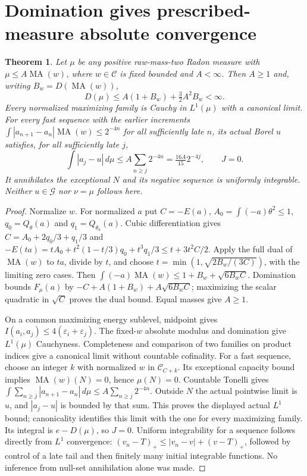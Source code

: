 \documentclass[11pt]{article}
\newtheorem{theorem}{Theorem}
\newcommand{\MA}{\operatorname{MA}}
\newcommand{\C}{\mathcal C}
\begin{document}
\section{Domination gives prescribed-measure absolute convergence}
\begin{theorem}\label{newns:domination}
Let $\mu$ be any positive raw-mass-two Radon measure with
$\mu\le A\MA(w)$, where $w\in\C$ is fixed bounded and $A<\infty$.
Then $A\ge1$ and, writing $B_w=D(\MA(w))$,
\[
 D(\mu)\le A(1+B_w)+\tfrac32A^2B_w<\infty.
\]
Every normalized maximizing family is Cauchy in $L^1(\mu)$ with a
canonical limit. For every fast sequence with the earlier increments
$\int|a_{n+1}-a_n|\MA(w)\le2^{-4n}$ for all sufficiently late $n$,
its actual Borel $u$ satisfies, for all sufficiently late $j$,
\[
 \int|a_j-u|\,d\mu\le A\sum_{n\ge j}2^{-4n}
 =\tfrac{16A}{15}2^{-4j},\qquad J=0.
\]
It annihilates the exceptional $N$ and its negative sequence is uniformly
integrable. Neither $u\in\mathcal G$ nor $\nu=\mu$ follows here.
\end{theorem}
\begin{proof}
Normalize $w$. For normalized $a$ put $C=-E(a)$,
$A_0=\int(-a)\theta^2\le1$, $q_0=Q_\theta(a)$ and
$q_1=Q_{\theta_a}(a)$. Cubic differentiation gives
$C=A_0+2q_0/3+q_1/3$ and
$-E(ta)=tA_0+t^2(1-t/3)q_0+t^3q_1/3\le t+3t^2C/2$.
Apply the full dual of $\MA(w)$ to $ta$, divide by $t$, and choose
$t=\min(1,\sqrt{2B_w/(3C)})$, with the limiting zero cases.
Then $\int(-a)\MA(w)\le1+B_w+\sqrt{6B_wC}$.
Domination bounds $F_\mu(a)$ by
$-C+A(1+B_w)+A\sqrt{6B_wC}$; maximizing the scalar quadratic
in $\sqrt C$ proves the dual bound. Equal masses give $A\ge1$.

On a common maximizing energy sublevel, midpoint gives
$I(a_i,a_j)\le4(\varepsilon_i+\varepsilon_j)$.
The fixed-$w$ absolute modulus and domination give $L^1(\mu)$
Cauchyness. Completeness and comparison of two families on product
indices give a canonical limit without countable cofinality.
For a fast sequence, choose an integer $k$ with normalized $w$ in
$\C_{C+k}$. Its exceptional capacity bound implies
$\MA(w)(N)=0$, hence $\mu(N)=0$.
Countable Tonelli gives
$\int\sum_{n\ge j}|a_{n+1}-a_n|\,d\mu\le A\sum_{n\ge j}2^{-4n}$.
Outside $N$ the actual pointwise limit is $u$, and
$|a_j-u|$ is bounded by that sum. This proves the displayed actual
$L^1$ bound; canonicality identifies this limit with the one for every
maximizing family. Its integral is $e-D(\mu)$, so $J=0$.
Uniform integrability for a sequence follows directly from $L^1$
convergence: $(v_n-T)_+\le|v_n-v|+(v-T)_+$, followed by control
of a late tail and then finitely many initial integrable functions.
No inference from null-set annihilation alone was made.
\end{proof}
\end{document}
